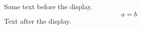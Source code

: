 \documentclass[12pt]{article}
\begin{document}
Some text before the display.
\begin{equation} a = b \tag{A} \end{equation}
Text after the display.
\end{document}
